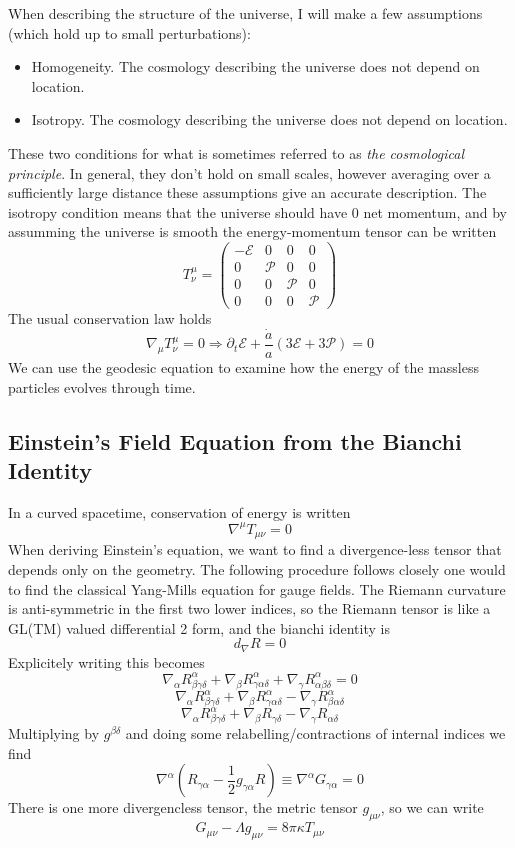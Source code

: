 When describing the structure of the universe, I will make a few assumptions (which hold up to small perturbations):
\begin{itemize}
    \item Homogeneity. The cosmology describing the universe does not depend on location.
    \item Isotropy. The cosmology describing the universe does not depend on location.
\end{itemize}
These two conditions for what is sometimes referred to as \textit{the cosmological principle}. In general, they don't hold on small scales, however averaging over a sufficiently large distance these assumptions give an accurate description. The isotropy condition means that the universe should have 0 net momentum, and by assumming the universe is smooth the energy-momentum tensor can be written
\begin{equation} T^\mu_\nu = \left(
\begin{array}{cccc}
    -\mathcal{E} & 0 & 0 & 0 \\
    0 & \mathcal{P} & 0 & 0 \\
    0 & 0 & \mathcal{P} & 0 \\
    0 & 0 & 0 & \mathcal{P}
\end{array}
\right)
\end{equation}
The usual conservation law holds
\begin{equation}
    \nabla_\mu T^{\mu}_{\nu} = 0 \Rightarrow \partial_t \mathcal{E} + \frac{\dot a}{a}(3\mathcal{E} + 3\mathcal{P}) = 0
\end{equation}
We can use the geodesic equation to examine how the energy of the massless particles evolves through time. 

\subsection{Einstein's Field Equation from the Bianchi Identity}
In a curved spacetime, conservation of energy is written
\[ \nabla^\mu T_{\mu\nu} = 0\]
When deriving Einstein's equation, we want to find a divergence-less tensor that depends only on the geometry. The following procedure follows closely one would to find the classical Yang-Mills equation for gauge fields. The Riemann curvature is anti-symmetric in the first two lower indices, so the Riemann tensor is like a GL(TM) valued differential 2 form, and the bianchi identity is
\[ d_{\nabla} R = 0 \]
Explicitely writing this becomes
\[ \nabla_{\alpha} R^{\alpha}_{\beta\gamma\delta} + \nabla_{\beta}R^{\alpha}_{\gamma\alpha\delta} + \nabla_{\gamma}R^{\alpha}_{\alpha\beta\delta} = 0 \]
\[ \nabla_{\alpha} R^{\alpha}_{\beta\gamma\delta} + \nabla_{\beta}R^{\alpha}_{\gamma\alpha\delta} - \nabla_{\gamma}R^{\alpha}_{\beta\alpha\delta} \]
\[ \nabla_{\alpha}R^{\alpha}_{\beta\gamma\delta} + \nabla_{\beta}R_{\gamma\delta} - \nabla_{\gamma}R_{\alpha\delta} \]
Multiplying by $g^{\beta\delta}$ and doing some relabelling/contractions of internal indices we find
\[ \nabla^\alpha(R_{\gamma\alpha}-\frac{1}{2}g_{\gamma\alpha}R) \equiv \nabla^{\alpha}G_{\gamma\alpha} = 0 \]
There is one more divergencless tensor, the metric tensor $g_{\mu\nu}$, so we can write
\[ G_{\mu\nu} - \Lambda g_{\mu\nu} = 8\pi\kappa T_{\mu\nu} \]

